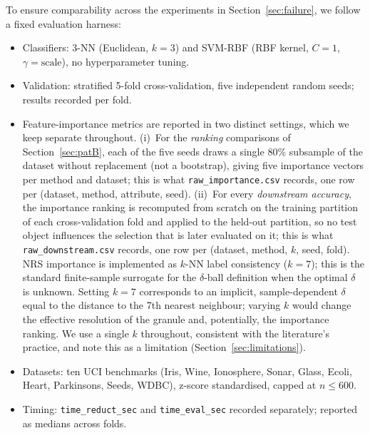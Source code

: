To ensure comparability across the experiments in Section~\ref{sec:failure},
we follow a fixed evaluation harness:
\begin{itemize}
  \item Classifiers: 3-NN (Euclidean, $k=3$) and SVM-RBF
        (RBF kernel, $C=1$, $\gamma=\text{scale}$), no hyperparameter tuning.
  \item Validation: stratified 5-fold cross-validation, five independent
        random seeds; results recorded per fold.
  \item Feature-importance metrics are reported in two distinct settings,
        which we keep separate throughout.  (i)~For the \emph{ranking}
        comparisons of Section~\ref{sec:patB}, each of the five seeds draws
        a single 80\% subsample of the dataset without replacement
        (not a bootstrap), giving five importance vectors per method and
        dataset; this is what \texttt{raw\_importance.csv} records, one row
        per (dataset, method, attribute, seed).  (ii)~For every
        \emph{downstream accuracy}, the importance ranking is recomputed
        from scratch on the training partition of each cross-validation
        fold and applied to the held-out partition, so no test object
        influences the selection that is later evaluated on it; this is
        what \texttt{raw\_downstream.csv} records, one row per
        (dataset, method, $k$, seed, fold).  NRS importance
        is implemented as $k$-NN label consistency ($k=7$); this
        is the standard finite-sample surrogate for the $\delta$-ball
        definition when the optimal $\delta$ is unknown.  Setting $k=7$
        corresponds to an implicit, sample-dependent $\delta$ equal to
        the distance to the 7th nearest neighbour; varying $k$ would change
        the effective resolution of the granule and, potentially, the
        importance ranking.  We use a single $k$ throughout, consistent
        with the literature's practice, and note this as a limitation
        (Section~\ref{sec:limitations}).
  \item Datasets: ten UCI benchmarks (Iris, Wine, Ionosphere, Sonar,
        Glass, Ecoli, Heart, Parkinsons, Seeds, WDBC),
        z-score standardised, capped at $n \leq 600$.
  \item Timing: \texttt{time\_reduct\_sec} and \texttt{time\_eval\_sec}
        recorded separately; reported as medians across folds.
\end{itemize}

